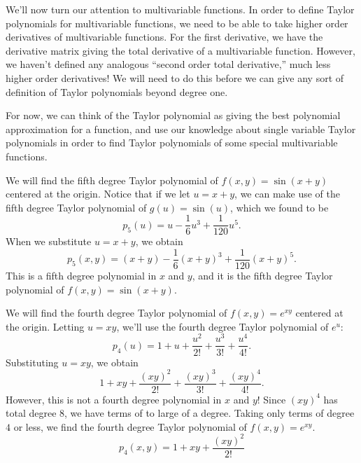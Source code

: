 \documentclass{ximera}
\begin{document}
We'll now turn our attention to multivariable functions. In order to define Taylor polynomials for multivariable functions, we need to be able to take higher order derivatives of multivariable functions. For the first derivative, we have the derivative matrix giving the total derivative of a multivariable function. However, we haven't defined any analogous ``second order total derivative,'' much less higher order derivatives! We will need to do this before we can give any sort of definition of Taylor polynomials beyond degree one.

For now, we can think of the Taylor polynomial as giving the best polynomial approximation for a function, and use our knowledge about single variable Taylor polynomials in order to find Taylor polynomials of some special multivariable functions.

\begin{example}
We will find the fifth degree Taylor polynomial of $f(x,y) = \sin (x+y)$ centered at the origin. Notice that if we let $u=x+y$, we can make use of the fifth degree Taylor polynomial of $g(u) = \sin(u)$, which we found to be
\[
p_5(u) = u-\frac{1}{6}u^3+\frac{1}{120}u^5.
\]
When we substitute $u = x+y$, we obtain
\[
p_5(x,y) = (x+y)-\frac{1}{6}(x+y)^3+\frac{1}{120}(x+y)^5.
\]
This is a fifth degree polynomial in $x$ and $y$, and it is the fifth degree Taylor polynomial of $f(x,y) = \sin(x+y)$.
\end{example}

\begin{example}
We will find the fourth degree Taylor polynomial of $f(x,y) = e^{xy}$ centered at the origin. Letting $u=xy$, we'll use the fourth degree Taylor polynomial of $e^u$:
\[
p_4(u) = 1 + u + \frac{u^2}{2!} +\frac{u^3}{3!} + \frac{u^4}{4!}.
\]
Substituting $u=xy$, we obtain
\[
1 + xy + \frac{(xy)^2}{2!} +\frac{(xy)^3}{3!} + \frac{(xy)^4}{4!}.
\]
However, this is not a fourth degree polynomial in $x$ and $y$! Since $(xy)^4$ has total degree $8$, we have terms of to large of a degree. Taking only terms of degree $4$ or less, we find the fourth degree Taylor polynomial of $f(x,y) = e^{xy}$.
\[
p_4(x,y) = 1 + xy + \frac{(xy)^2}{2!}
\]
\end{example}
\end{document}
